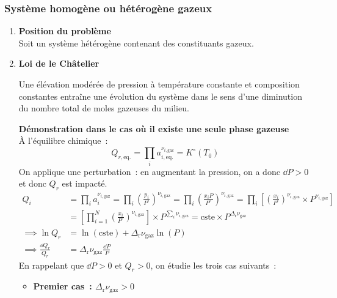 \documentclass{article}
\newcommand{\Dr}{\Delta_{\mathrm{r}}}
\newcommand{\cste}{\text{cste}}
\newcommand{\equi}{\text{eq.}}
\newcommand{\gaz}{\text{gaz}}
\begin{document}
        \subsubsection{Système homogène ou hétérogène gazeux}
        \begin{enumerate}[label={\textsf{\textbf{\roman*)}}}]
            \item \textbf{\textsf{Position du problème}}\\
            Soit un système hétérogène contenant des constituants gazeux.
            \item \textbf{\textsf{Loi de le Châtelier}}
            \begin{enonce}
                Une élévation modérée de pression à température constante et composition constantes entraîne une évolution du système dans le sens d’une diminution du nombre total de moles gazeuses du milieu.
            \end{enonce}
            \begin{tableau}
                \textbf{Démonstration dans le cas où il existe une seule phase gazeuse}\\
                À l'équilibre chimique~:
                $$Q_{r,\equi} = \prod_ia_{i,\equi}^{\nu_{i,\gaz}} = K^\circ(T_0)$$
                On applique une perturbation~: en augmentant la pression, on a donc $\dd{P}>0$ et donc $Q_r$ est impacté.
                \begin{align*}
                    Q_i&=\prod_ia_i^{\nu_{i,\gaz}}=\prod_i \left(\frac{p_i}{P^\circ}\right)^{\nu_{i,\gaz}}=\prod_i \left(\frac{x_iP}{P^\circ}\right)^{\nu_{i,\gaz}}=\prod_i \left[\left(\frac{x_i}{P^\circ}\right)^{\nu_{i,\gaz}}\times P^{\nu_{i,\gaz}}\right]\\
                    &=\left[\prod_{i=1}^N \left(\frac{x_i}{P^\circ}\right)^{\nu_{i,\gaz}}\right]\times P^{\sum_i\nu_{i,\gaz}} = \cste \times P^{\Dr \nu_{\gaz}}\\
                    \implies \ln Q_r &= \ln(\cste) + \Dr \nu_{\gaz}\ln(P)\\
                    \implies \frac{\dd{Q_r}}{Q_r} &= \Dr \nu_{\gaz}\frac{\dd{P}}{P}
                \end{align*}
                En rappelant que $\dd{P} >0$ et $Q_r >0$, on étudie les trois cas suivants~:
                \begin{itemize}[label=\textbullet]
                    \item \textbf{Premier cas~: $\Dr \nu_{\gaz} >0$}\\

\end{itemize}
\end{tableau}
\end{enumerate}
\end{document}
